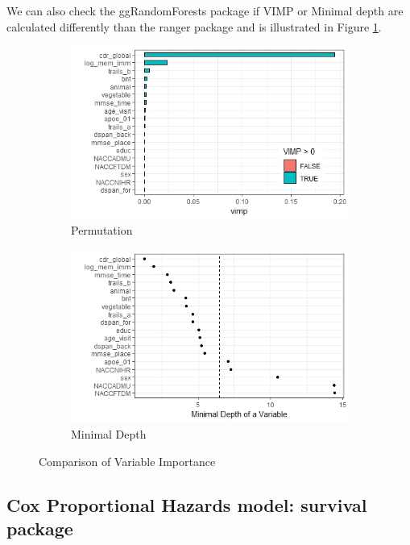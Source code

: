 \documentclass[a4paper,man,natbib,11pt]{article}
\begin{document}
We can also check the ggRandomForests package if VIMP or Minimal depth are calculated differently than the ranger package and is illustrated in Figure \ref{fig:ggVI}. 

\begin{figure}[h!]
\centering
\begin{subfigure}{.5\textwidth}
  \centering
  \includegraphics[width=\linewidth]{figures/VI_SRF.jpeg}
  \caption{Permutation}
\end{subfigure}%
\begin{subfigure}{.5\textwidth}
  \centering
  \includegraphics[width=\linewidth]{figures/MD_SRF.jpeg}
  \caption{Minimal Depth}
\end{subfigure}
\caption{Comparison of Variable Importance}
\label{fig:ggVI}
\end{figure}



\subsection{Cox Proportional Hazards model: survival package}
\end{document}
